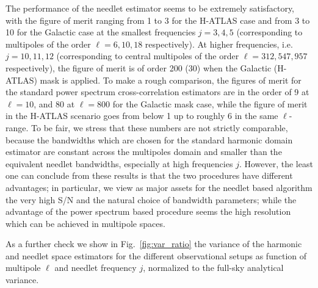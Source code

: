 The performance of the needlet estimator seems to be extremely satisfactory, with the figure of merit ranging from 1 to 3 for the H-ATLAS case and from 3 to 10 for the Galactic case at the smallest frequencies $j=3,4,5$ (corresponding to multipoles of the order $\ell = 6, 10, 18$ respectively). At higher  frequencies, i.e. $j=10,11,12$ (corresponding to central multipoles of the order $\ell = 312,547,957$ respectively), the figure of merit is of order 200 (30) when the Galactic (H-ATLAS) mask is applied. To make a rough comparison, the figures of merit for the standard power spectrum cross-correlation estimators are in the order of 9 at $\ell = 10$, and 80 at $\ell = 800$ for the Galactic mask case, while the 
figure of merit in the H-ATLAS scenario goes from below 1 up to roughly 6 in the same $\ell$-range. To be fair, we stress that these numbers are not strictly comparable, because the bandwidths which are chosen for the standard harmonic domain estimator are constant across the multipoles domain and smaller than the equivalent needlet bandwidths, especially at high frequencies $j$. However, the least one can conclude from these results is that the two procedures have different advantages; in particular, we view as major assets for the needlet based algorithm the very high S/N and the natural choice of bandwidth parameters; while the advantage of the power spectrum based procedure seems the high resolution which can be achieved in multipole spaces.

As a further check we show in Fig.~\eqref{fig:var_ratio} the variance of the harmonic and needlet space 
estimators for the different observational setups as function of multipole $\ell$ and needlet frequency $j$,
normalized to the full-sky analytical variance.

